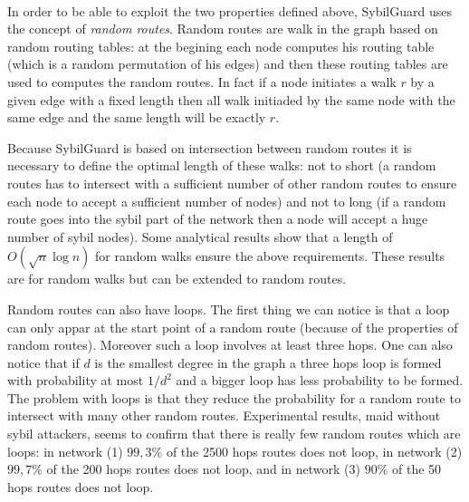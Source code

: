 \documentclass[a4paper,11pt]{article}
\begin{document}
\paragraph{}
In order to be able to exploit the two properties defined above, SybilGuard uses the concept of \emph{random routes}.
Random routes are walk in the graph based on random routing tables: at the begining each node computes his routing table (which is a random permutation of his edges) and then these routing tables are used to computes the random routes.
In fact if a node initiates a walk $r$ by a given edge with a fixed length then all walk initiaded by the same node with the same edge and the same length will be exactly $r$.

Because SybilGuard is based on intersection between random routes it is necessary to define the optimal length of these walks: not to short (a random routes has to intersect with a sufficient number of other random routes to ensure each node to accept a sufficient number of nodes) and not to long (if a random route goes into the sybil part of the network then a node will accept a huge number of sybil nodes).
Some analytical results show that a length of $O(\sqrt{n} \log n)$ for random walks ensure the above requirements. 
These results are for random walks but can be extended to random routes.

Random routes can also have loops.
The first thing we can notice is that a loop can only appar at the start point of a random route (because of the properties of random routes).
Moreover such a loop involves at least three hops.
One can also notice that if $d$ is the smallest degree in the graph a three hops loop is formed with probability at most $1/d^2$ and a bigger loop has less probability to be formed.
The problem with loops is that they reduce the probability for a random route to intersect with many other random routes. 
Experimental results, maid without sybil attackers, seems to confirm that there is really few random routes which are loops: in network (1) $99,3\%$ of the 2500 hops routes does not loop, in network (2) $99,7\%$ of the 200 hops routes does not loop, and in network (3) $90\%$ of the 50 hops routes does not loop.


\end{document}
